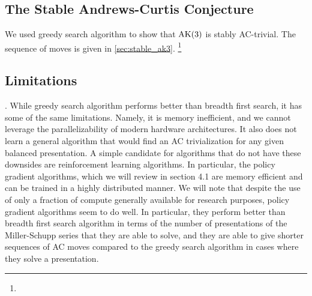 \subsection{The Stable Andrews-Curtis Conjecture}
We used greedy search algorithm to show that $\text{AK}(3)$ is stably AC-trivial. The sequence of moves is given in \autoref{sec:stable_ak3}.
\footnote{}


\subsection{Limitations}. While greedy search algorithm performs better than breadth first search, it has some of the same limitations. Namely, it is memory inefficient, and we cannot leverage the parallelizability of modern hardware architectures. It also does not learn a general algorithm that would find an AC trivialization for any given balanced presentation. A simple candidate for algorithms that do not have these downsides are reinforcement learning algorithms. In particular, the policy gradient algorithms, which we will review in section 4.1 are memory efficient and can be trained in a highly distributed manner. We will note that despite the use of only a fraction of compute generally available for research purposes, policy gradient algorithms seem to do well. In particular, they perform better than breadth first search algorithm in terms of the number of presentations of the Miller-Schupp series that they are able to solve, and they are able to give shorter sequences of AC moves compared to the greedy search algorithm in cases where they solve a presentation. 
